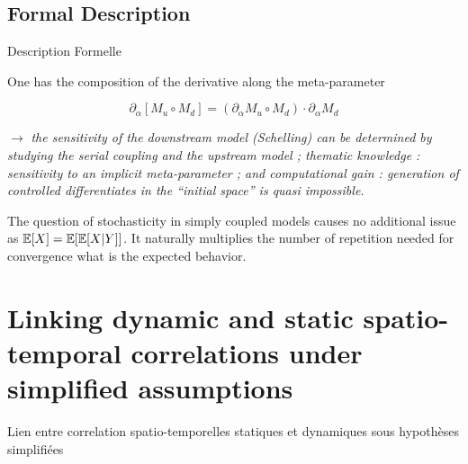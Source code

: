 



\subsection{Formal Description}{Description Formelle}


One has the composition of the derivative along the meta-parameter

\[
\partial_{\alpha}\left[M_u \circ M_d\right] = \left(\partial_{\alpha} M_u \circ M_d \right)\cdot \partial_{\alpha} M_d
\]

$\rightarrow$ \textit{the sensitivity of the downstream model (Schelling) can be determined by studying the serial coupling and the upstream model ; thematic knowledge : sensitivity to an implicit meta-parameter ; and computational gain : generation of controlled differentiates in the ``initial space'' is quasi impossible.}


The question of stochasticity in simply coupled models causes no additional issue as $\operatorname{\mathbb{E}}\!\left[X\right]=\operatorname{\mathbb{E}}\!\left[\operatorname{\mathbb{E}}\!\left[X|Y\right]\right]$. It naturally multiplies the number of repetition needed for convergence what is the expected behavior.







\newpage




\section[Spatio-temporal Correlations][Correlations spatio-temporelles]{Linking dynamic and static spatio-temporal correlations under simplified assumptions}{Lien entre correlation spatio-temporelles statiques et dynamiques sous hypothèses simplifiées}

